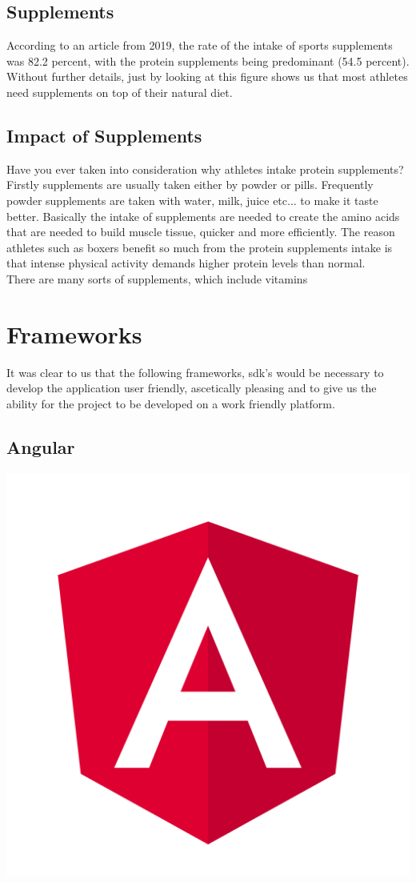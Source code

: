 \documentclass[a4paper,12pt]{report}
\begin{document}
\subsection{Supplements}
According to an article from 2019, the rate of the intake of sports supplements was 82.2 percent, with the protein supplements being predominant (54.5 percent). Without further details, just by looking at this figure shows us that most athletes need supplements on top of their natural diet.
\cite{Supplements}
\subsection{Impact of Supplements}
Have you ever taken into consideration why athletes intake protein supplements?\\ Firstly supplements are usually taken either by powder or pills. Frequently powder supplements are taken with water, milk, juice etc... to make it taste better. Basically the intake of supplements are needed to create the amino acids that are needed to build muscle tissue, quicker and more efficiently. The reason athletes such as boxers benefit so much from the protein supplements intake is that intense physical activity demands higher protein levels than normal.
\\
There are many sorts of supplements, which include vitamins 
\newpage
\section{Frameworks}

It was clear to us that the following frameworks, sdk's would be necessary to develop the application user friendly, ascetically pleasing and to give us the ability for the project to be developed on a work friendly platform.

\subsection{Angular}
\includegraphics[scale=.015]{images/angular.png}
\end{document}
